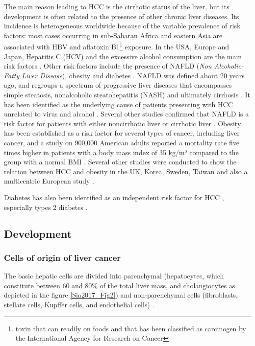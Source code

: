 The main reason leading to HCC is the cirrhotic status of the
liver, but its development is often related to the presence of other
chronic liver diseases.
Its incidence is heterogeneous worldwide because of the variable
prevalence of risk factors: most cases occurring in sub-Saharan Africa
and eastern Asia are associated with HBV and aflatoxin B1\footnote{toxin that can readily on foods and that has been classified as carcinogen by the International Agency for Research on Cancer}
exposure. In the USA, Europe and Japan, Hepatitis C (HCV) and the
excessive alcohol consumption are the main risk factors \cite{Forner2018}. 
Other risk factors include the presence of NAFLD (\emph{Non Alcoholic-Fatty Liver
Disease}), obesity and diabetes \cite{Marengo2016}. 
NAFLD was defined about 20 years ago, and regroups a spectrum of
progressive liver diseases that encompasses simple steatosis,
nonalcoholic steatohepatitis (NASH) and ultimately cirrhosis
\cite{Marengo2016}. It has been identified as the
underlying cause of patients presenting with HCC unrelated to
virus and alcohol \cite{Marrero2002}.
Several other studies confirmed that NAFLD is a risk factor for
patients with either noncirrhotic liver \cite{Paradis2009, Dyson2014} or cirrhotic liver \cite{Wong2014, Ascha2010, Mittal2015}.
Obesity has been established as a risk factor for several types of
cancer, including liver cancer, and a study on 900,000 American adults
reported a mortality rate five times higher in patients with a body mass
index of 35 kg/m² compared to the group with a normal BMI \cite{Calle2003}. Several other studies were conducted to show
the relation between HCC and obesity in the UK, Korea, Sweden, Taiwan
and also a multicentric European study \cite{Chen2008, Schlesinger2012, Samanic2006, Oh2005, Batty2005}.

Diabetes has also been identified as an independent risk factor for HCC
\cite{Forner2018}, especially types 2 diabetes \cite{Noto2010,Wideroff1997,El-Serag2004,Davila2005,Inoue2006}.


\subsection{Development}\label{development}

\subsubsection{Cells of origin of liver cancer}\label{cells-of-origin-of-liver-cancer}

The basic hepatic cells are divided into parenchymal (hepatocytes, which
constitute between 60 and 80\% of the total liver mass, and
cholangiocytes as depicted in the figure \ref{Sia2017_Fig2}) and non-parenchymal
cells (fibroblasts, stellate cells, Kupffer cells, and endothelial
cells) \cite{Sia2017}.

